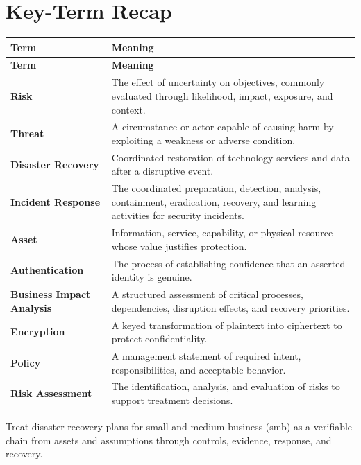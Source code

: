 \documentclass[11pt]{article}
\begin{document}
\section*{Key-Term Recap}
\begin{longtable}{>{\RaggedRight\arraybackslash}p{}>{\RaggedRight\arraybackslash}p{}}
\toprule\rowcolor{Navy}\color{white}\textbf{Term} & \color{white}\textbf{Meaning}\\\midrule
\endfirsthead
\toprule\rowcolor{Navy}\color{white}\textbf{Term} & \color{white}\textbf{Meaning}\\\midrule
\endhead
\textbf{Risk} & The effect of uncertainty on objectives, commonly evaluated through likelihood, impact, exposure, and context. \\\midrule
\textbf{Threat} & A circumstance or actor capable of causing harm by exploiting a weakness or adverse condition. \\\midrule
\textbf{Disaster Recovery} & Coordinated restoration of technology services and data after a disruptive event. \\\midrule
\textbf{Incident Response} & The coordinated preparation, detection, analysis, containment, eradication, recovery, and learning activities for security incidents. \\\midrule
\textbf{Asset} & Information, service, capability, or physical resource whose value justifies protection. \\\midrule
\textbf{Authentication} & The process of establishing confidence that an asserted identity is genuine. \\\midrule
\textbf{Business Impact Analysis} & A structured assessment of critical processes, dependencies, disruption effects, and recovery priorities. \\\midrule
\textbf{Encryption} & A keyed transformation of plaintext into ciphertext to protect confidentiality. \\\midrule
\textbf{Policy} & A management statement of required intent, responsibilities, and acceptable behavior. \\\midrule
\textbf{Risk Assessment} & The identification, analysis, and evaluation of risks to support treatment decisions. \\\midrule
\bottomrule
\end{longtable}
\begin{takeawaybox}
Treat disaster recovery plans for small and medium business (smb) as a verifiable chain from assets and assumptions through controls, evidence, response, and recovery.
\end{takeawaybox}
\end{document}

